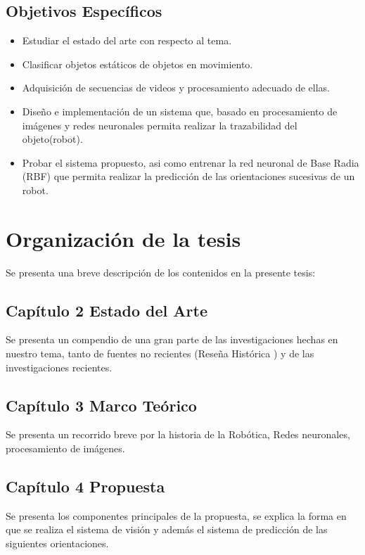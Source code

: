 \subsection{Objetivos Espec\'ificos}
\begin{itemize}
\item Estudiar el estado del arte con respecto al tema.
\item Clasificar objetos est\'aticos de objetos en movimiento.
\item Adquisici\'on de secuencias de videos y procesamiento adecuado de ellas.
\item Dise\~no e implementaci\'on de un sistema que, basado en procesamiento de im\'agenes y redes neuronales permita realizar la trazabilidad del objeto(robot).
\item Probar el sistema propuesto, asi como entrenar la red neuronal de Base Radia (RBF) que permita realizar la predicci\'on de las orientaciones sucesivas de un robot.
\end{itemize}

\section{Organizaci\'on de la tesis}
Se presenta una breve descripci\'on  de los contenidos en la presente tesis:
\subsection{Cap\'itulo 2 Estado del Arte}
Se presenta un compendio de una gran parte de las investigaciones hechas en nuestro tema, tanto de fuentes no recientes (Rese\~na Hist\'orica ) y de las investigaciones recientes.
\subsection{Cap\'itulo 3 Marco Te\'orico}
Se presenta un recorrido breve por la historia de la Rob\'otica, Redes neuronales, procesamiento de im\'agenes.
\subsection{Cap\'itulo 4  Propuesta}
Se presenta los componentes principales de la propuesta, se explica la forma en que se realiza el sistema de visi\'on y adem\'as el sistema de predicci\'on de las siguientes orientaciones.
